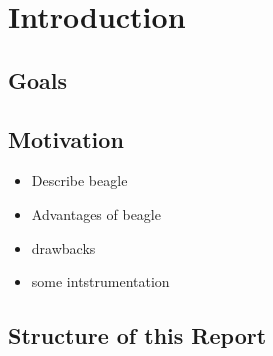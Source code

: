 
\chapter{Introduction}
\label{cha:intro}

\section{Goals}

\section{Motivation}
\label{sec:mot}

\begin{itemize}
\item Describe beagle
\item Advantages of beagle
\item drawbacks
\item some intstrumentation
\end{itemize}

\section{Structure of this Report}
\label{sec:framework}

